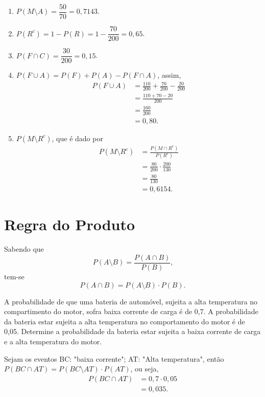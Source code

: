 \documentclass[11pt,fleqn]{book}
\numberwithin{mpicture}{chapter}
\numberwithin{mtable}{chapter}
\numberwithin{mframe}{chapter}
\begin{document}
\begin{pageWidthArea}
\begin{example}
\begin{multicols}{2}
\begin{enumerate}[label=\alph*), itemsep=10pt]
				\item $P(M\setminus A)=\dfrac{50}{70}=0,7143$.
		
				\item $P(R^c)=1-P(R)=1-\dfrac{70}{200}=0,65$.
		
				\item $P(F\cap C)=\dfrac{30}{200}=0,15$.
				
				\item $P(F\cup A) = P(F) + P(A) - P(F\cap A)$, assim,
				\begin{align*}
					P(F\cup A) &= \frac{110}{200}+\frac{70}{200}-\frac{20}{200}\\
							   &= \frac{110+70-20}{200}\\
							   &= \frac{160}{200}\\
							   &=0,80\text{.}
				\end{align*}
				
				\item $P(M\setminus R^c)$, que é dado por
				\begin{align*}
					P(M\setminus R^c) &= \frac{P(M\cap R^c)}{P(R^c)}\\
									  &= \frac{80}{200}\cdot \frac{200}{130}\\
									  &= \frac{80}{130}\\
									  &= 0,6154\text{.}
				\end{align*}
			\end{enumerate}
		\end{multicols}
	\end{example}
\end{pageWidthArea}

\section{Regra do Produto}

Sabendo que
\[
	P(A\setminus B)=\frac{P(A \cap B)}{P(B)}\text{,}
\]
tem-se
\begin{equation}
	P(A\cap B)=P(A\setminus B)\cdot P(B)\text{.}
\end{equation}

\begin{example}
	A probabilidade de que uma bateria de automóvel, sujeita a alta temperatura no compartimento do motor, sofra baixa corrente de carga é de 0,7. A probabilidade da bateria estar sujeita a alta temperatura no comportamento do motor é de 0,05. Determine a probabilidade da bateria estar sujeita a baixa corrente de carga e a alta temperatura do motor.
	
	Sejam os eventos BC: "baixa corrente"; AT: "Alta temperatura", então $P(BC\cap AT)=P(BC\setminus AT)\cdot P(AT)$, ou seja,
	\begin{align*}
		P(BC\cap AT)&=0,7\cdot 0,05\\
					&=0,035\text{.}
	\end{align*}
\end{example}
\end{document}
